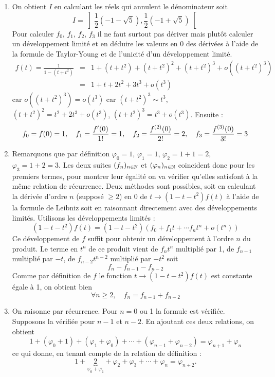 \begin{enumerate}
\item  On obtient $I$ en calculant les r{\'e}els qui annulent le
d{\'e}nominateur soit
\[
I=\left] \frac{1}{2}(-1-\sqrt{5}),\frac{1}{2}(-1+\sqrt{5})\right[ \]
Pour calculer $f_{0}$, $f_{1}$, $f_{2}$, $f_{3}$ il ne faut surtout pas d{\'e}river mais plut{\^o}t calculer un d{\'e}veloppement limit{\'e} et en d{\'e}duire les valeurs en 0 des d{\'e}riv{\'e}es {\`a} l'aide de la formule de Taylor-Young et de l'unicit{\'e} d'un d{\'e}veloppement limit{\'e}.
\begin{eqnarray*}
f(t)=\frac{1}{1-(t+t^{2})} &=& 1+(t+t^{2})+(t+t^{2})^{2}+(t+t^{2})^{3}+o((t+t^{2})^{3})\\
&=& 1+t+2t^{2}+3t^{3}+o(t^{3})
\end{eqnarray*}
car $o((t+t^{2})^{3})=o(t^{3})$ car $(t+t^{2})^{3}\sim t^{3}$, $%
(t+t^{2})^{2}=t^{2}+2t^{3}+o(t^{3})$, $(t+t^{2})^{3}=t^{3}+o(t^{3})$.\newline
Ensuite :
\[
f_{0}=f(0)=1,\quad f_{1}=\frac{f^{\prime }(0)}{1!}=1,\quad f_{2}=\frac{%
f^{(2)}(0)}{2!}=2,\quad f_{3}=\frac{f^{(3)}(0)}{3!}=3
\]

\item  Remarquons que par d{\'e}finition $\varphi _{0}=1$, $\varphi _{1}=1$,
$\varphi _{2}=1+1=2$, $\varphi _{3}=1+2=3.$ Les deux suites $(f_{n})_{n\in
\mathbb{N}}$ et $(\varphi _{n})_{n\in \mathbb{N}}$ coincident donc pour les
premiers termes, pour montrer leur {\'e}galit{\'e} on va v{\'e}rifier
qu'elles satisfont {\`a} la m{\^e}me relation de r{\'e}currence. Deux
m{\'e}thodes sont possibles, soit en calculant la d{\'e}riv{\'e}e d'ordre $n$
(suppos{\'e} $\geq 2$) en 0 de $t\rightarrow (1-t-t^{2})f(t)$ {\`a} l'aide
de la formule de Leibniz soit en raisonnant directement avec des
d{\'e}veloppements limit{\'e}s. Utilisons les d{\'e}veloppements limit{\'e}s
:
\[
(1-t-t^{2})f(t)=(1-t-t^{2})(f_{0}+f_{1}t+\cdots f_{n}t^{n}+o(t^{n}))
\]
Ce d{\'e}veloppement de $f$ suffit pour obtenir un d{\'e}veloppement {\`a}
l'ordre $n$ du produit. Le terme en $t^{n}$ de ce produit vient de $%
f_{n}t^{n}$ multipli{\'e} par 1, de $f_{n-1}$ multipli{\'e} par $-t$, de $%
f_{n-2}t^{n-2}$ multipli{\'e} par $-t^{2}$ soit
\[
f_{n}-f_{n-1}-f_{n-2}
\]
Comme par d{\'e}finition de $f$ le fonction $t\rightarrow (1-t-t^{2})f(t)$
est constante {\'e}gale {\`a} 1, on obtient bien
\[
\forall n\geq 2,\quad f_{n}=f_{n-1}+f_{n-2}
\]

\item  On raisonne par r{\'e}currence. Pour $n=0$ ou 1 la formule est v{\'e}rifi{\'e}e. Supposons la v{\'e}rifi{\'e}e pour $n-1$ et $n-2$. En ajoutant ces deux relations, on obtient
\[
1+(\varphi _{0}+1)+(\varphi _{1}+\varphi _{0})+\cdots +(\varphi
_{n-1}+\varphi _{n-2})=\varphi _{n+1}+\varphi _{n}
\]
ce qui donne, en tenant compte de la relation de d{\'e}finition :
\[
1+ \underbrace{2}_{\varphi _{0}+\varphi _{1}}+\varphi_{2}+\varphi _{3}+\cdots +\varphi _{n}=\varphi _{n+2}.
\]


\end{enumerate}
